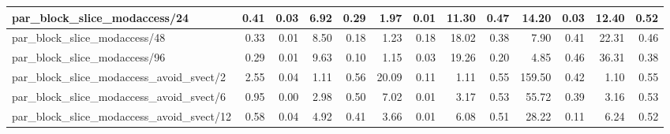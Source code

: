 \begin{table}[H]
\begin{tabular}{|lllllllllllll|}
		\multicolumn{1}{|l|}{par\_block\_slice\_modaccess/24}  & \multicolumn{1}{r|}{0.41} & \multicolumn{1}{r|}{0.03} & \multicolumn{1}{r|}{6.92} & \multicolumn{1}{r|}{0.29}  & \multicolumn{1}{r|}{1.97} & \multicolumn{1}{r|}{0.01} & \multicolumn{1}{r|}{11.30} & \multicolumn{1}{r|}{0.47}  & \multicolumn{1}{r|}{14.20} & \multicolumn{1}{r|}{0.03} & \multicolumn{1}{r|}{12.40} & \multicolumn{1}{r|}{0.52}  \\ \hline
		\multicolumn{1}{|l|}{par\_block\_slice\_modaccess/48}  & \multicolumn{1}{r|}{0.33} & \multicolumn{1}{r|}{0.01} & \multicolumn{1}{r|}{8.50} & \multicolumn{1}{r|}{0.18}  & \multicolumn{1}{r|}{1.23} & \multicolumn{1}{r|}{0.18} & \multicolumn{1}{r|}{18.02} & \multicolumn{1}{r|}{0.38}  & \multicolumn{1}{r|}{7.90} & \multicolumn{1}{r|}{0.41} & \multicolumn{1}{r|}{22.31} & \multicolumn{1}{r|}{0.46}  \\ \hline
		\multicolumn{1}{|l|}{par\_block\_slice\_modaccess/96}  & \multicolumn{1}{r|}{0.29} & \multicolumn{1}{r|}{0.01} & \multicolumn{1}{r|}{9.63} & \multicolumn{1}{r|}{0.10}  & \multicolumn{1}{r|}{1.15} & \multicolumn{1}{r|}{0.03} & \multicolumn{1}{r|}{19.26} & \multicolumn{1}{r|}{0.20}  & \multicolumn{1}{r|}{4.85} & \multicolumn{1}{r|}{0.46} & \multicolumn{1}{r|}{36.31} & \multicolumn{1}{r|}{0.38}  \\ \hline
		\multicolumn{1}{|l|}{par\_block\_slice\_modaccess\_avoid\_svect/2}  & \multicolumn{1}{r|}{2.55} & \multicolumn{1}{r|}{0.04} & \multicolumn{1}{r|}{1.11} & \multicolumn{1}{r|}{0.56}  & \multicolumn{1}{r|}{20.09} & \multicolumn{1}{r|}{0.11} & \multicolumn{1}{r|}{1.11} & \multicolumn{1}{r|}{0.55}  & \multicolumn{1}{r|}{159.50} & \multicolumn{1}{r|}{0.42} & \multicolumn{1}{r|}{1.10} & \multicolumn{1}{r|}{0.55}  \\ \hline
		\multicolumn{1}{|l|}{par\_block\_slice\_modaccess\_avoid\_svect/6}  & \multicolumn{1}{r|}{0.95} & \multicolumn{1}{r|}{0.00} & \multicolumn{1}{r|}{2.98} & \multicolumn{1}{r|}{0.50}  & \multicolumn{1}{r|}{7.02} & \multicolumn{1}{r|}{0.01} & \multicolumn{1}{r|}{3.17} & \multicolumn{1}{r|}{0.53}  & \multicolumn{1}{r|}{55.72} & \multicolumn{1}{r|}{0.39} & \multicolumn{1}{r|}{3.16} & \multicolumn{1}{r|}{0.53}  \\ \hline
		\multicolumn{1}{|l|}{par\_block\_slice\_modaccess\_avoid\_svect/12}  & \multicolumn{1}{r|}{0.58} & \multicolumn{1}{r|}{0.04} & \multicolumn{1}{r|}{4.92} & \multicolumn{1}{r|}{0.41}  & \multicolumn{1}{r|}{3.66} & \multicolumn{1}{r|}{0.01} & \multicolumn{1}{r|}{6.08} & \multicolumn{1}{r|}{0.51}  & \multicolumn{1}{r|}{28.22} & \multicolumn{1}{r|}{0.11} & \multicolumn{1}{r|}{6.24} & \multicolumn{1}{r|}{0.52}  \\ \hline

\end{tabular}
\end{table}
